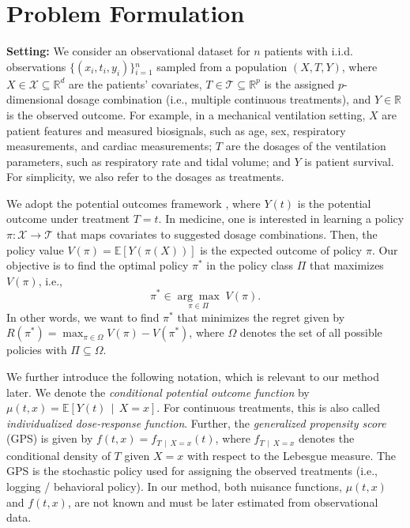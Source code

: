 \documentclass{article}
\theoremstyle{definition}
\theoremstyle{plain}
\begin{document}
\section{Problem Formulation}\label{sec:problem}

\textbf{Setting:} We consider an observational dataset for $n$ patients with i.i.d. observations $\{(x_i, t_i, y_i)\}{_{i=1}^{n}}$ sampled from a population $(X, T, Y)$, where $X \in \mathcal{X} \subseteq \mathbb{R}^{d} $ are the patients' covariates, $T \in \mathcal{T} \subseteq \mathbb{R}^{p} $ is the assigned $p$-dimensional dosage combination (i.e., multiple continuous treatments), and $Y \in \mathbb{R}$ is the observed outcome. For example, in a mechanical ventilation setting, $X$ are patient features and measured biosignals, such as age, sex, respiratory measurements, and cardiac measurements; $T$ are the dosages of the ventilation parameters, such as respiratory rate and tidal volume; and $Y$ is patient survival. For simplicity, we also refer to the dosages as treatments. 

We adopt the potential outcomes framework \cite{Rubin.1978}, where $Y(t)$ is the potential outcome under treatment $T=t$. %
In medicine, one is interested in learning a policy $\pi: \mathcal{X} \rightarrow \mathcal{T}$ that maps covariates to suggested dosage combinations. Then, the policy value $V(\pi) = \mathbb{E}[Y(\pi(X))] $ is the expected outcome of policy $\pi$. Our objective is to find the optimal policy $\pi^*$ in the policy class $\Pi$ that maximizes $V(\pi)$, i.e., 
\begin{equation} \label{eq:prob_baseobjective}
    \pi^* \in \underset{\pi \in \Pi}{\arg\max} \; V(\pi). 
\end{equation}
In other words, we want to find $\pi^*$ that minimizes the regret given by $R(\pi^*) = \max_{\pi \in \Omega} \! V(\pi) - V(\pi^*)$, where $\Omega$ denotes the set of all possible policies with $\Pi \subseteq \Omega$. 

We further introduce the following notation, which is relevant to our method later. We denote the \emph{conditional potential outcome function} by $\mu(t, x) = \mathbb{E} [Y(t) \,\mid\, X=x ]$. For continuous treatments, this is also called \emph{individualized dose-response function}. Further, the \emph{generalized propensity score} (GPS) is given by $f(t, x) = f_{T\,\mid\, X=x}(t) $, where $f_{T\,\mid\,X=x}$ denotes the conditional density of $T$ given $X=x$ with respect to the Lebesgue measure. The GPS is the stochastic policy used for assigning the observed treatments (i.e., logging / behavioral policy). In our method, both nuisance functions, $\mu(t, x)$ and $f(t, x)$, are not known and must be later estimated from observational data.
\end{document}
